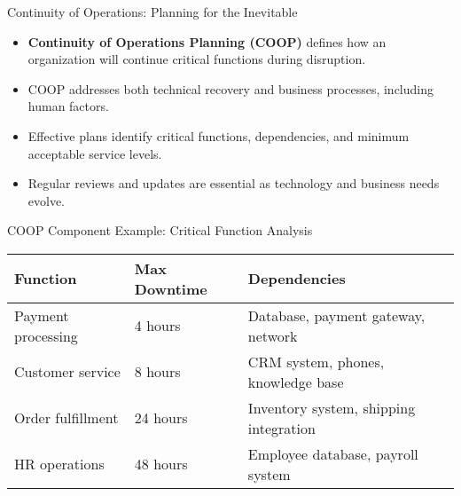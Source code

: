 \documentclass{beamer}
\begin{document}
\begin{frame}{Continuity of Operations: Planning for the Inevitable}
    \begin{itemize}
        \item \textbf{Continuity of Operations Planning (COOP)} defines how an organization will continue critical functions during disruption.
        \item COOP addresses both technical recovery and business processes, including human factors.
        \item Effective plans identify critical functions, dependencies, and minimum acceptable service levels.
        \item Regular reviews and updates are essential as technology and business needs evolve.
    \end{itemize}
    
    \begin{exampleblock}{COOP Component Example: Critical Function Analysis}
        \scriptsize
        \begin{tabular}{p{3cm}p{2cm}p{4cm}}
            \textbf{Function} & \textbf{Max Downtime} & \textbf{Dependencies} \\
            \hline
            Payment processing & 4 hours & Database, payment gateway, network \\
            Customer service & 8 hours & CRM system, phones, knowledge base \\
            Order fulfillment & 24 hours & Inventory system, shipping integration \\
            HR operations & 48 hours & Employee database, payroll system \\
        \end{tabular}
    \end{exampleblock}
\end{frame}
\end{document}
